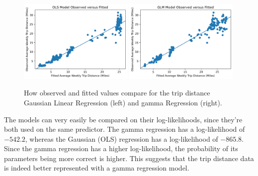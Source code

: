 \documentclass[11pt]{article}
\begin{document}
    \begin{figure}[H]
        \includegraphics[width=0.49\textwidth]{../plots/diagnostic-ols-Observed Average Weekly Trip Distance (Miles)-vs-Fitted Average Weekly Trip Distance (Miles).png}
        \includegraphics[width=0.49\textwidth]{../plots/diagnostic-glm-Observed Average Weekly Trip Distance (Miles)-vs-Fitted Average Weekly Trip Distance (Miles).png}
        \centering
        \caption{How observed and fitted values compare for the trip distance Gaussian Linear Regression (left) and gamma Regression (right).} %
        \label{fig:diag}
    \end{figure}

The models can very easily be compared on their log-likelihoods, since they're both used on the same predictor.
The gamma regression has a log-likelihood of $-542.2$, whereas the Gaussian (OLS) regression has a log-likelihood of $-865.8$.
Since the gamma regression has a higher log-likelihood, the probability of its parameters being more correct
is higher. This suggests that the trip distance data is indeed better represented with a gamma regression model.


\end{document}
